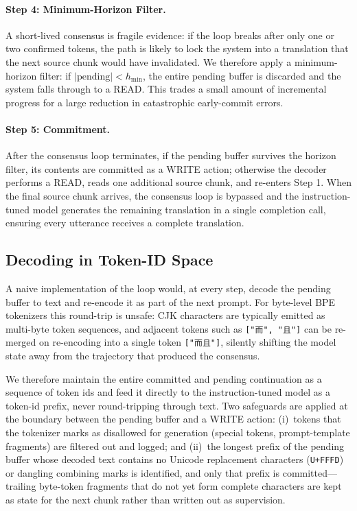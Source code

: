 \paragraph{Step 4: Minimum-Horizon Filter.}
A short-lived consensus is fragile evidence: if the loop breaks after only
one or two confirmed tokens, the path is likely to lock the system into a
translation that the next source chunk would have invalidated. We therefore
apply a minimum-horizon filter: if $|\text{pending}| < h_{\min}$, the entire
pending buffer is discarded and the system falls through to a READ. This
trades a small amount of incremental progress for a large reduction in
catastrophic early-commit errors.

\paragraph{Step 5: Commitment.}
After the consensus loop terminates, if the pending buffer survives the
horizon filter, its contents are committed as a WRITE action; otherwise the
decoder performs a READ, reads one additional source chunk, and re-enters
Step 1. When the final source chunk arrives, the consensus loop is bypassed
and the instruction-tuned model generates the remaining translation in a
single completion call, ensuring every utterance receives a complete
translation.

\subsection{Decoding in Token-ID Space}

A naive implementation of the loop would, at every step, decode the pending
buffer to text and re-encode it as part of the next prompt. For byte-level
BPE tokenizers this round-trip is unsafe: CJK characters are typically
emitted as multi-byte token sequences, and adjacent tokens such as
\texttt{["而", "且"]} can be re-merged on re-encoding into a single token
\texttt{["而且"]}, silently shifting the model state away from the
trajectory that produced the consensus.

We therefore maintain the entire committed and pending continuation as a
sequence of token ids and feed it directly to the instruction-tuned model
as a token-id prefix, never round-tripping through text. Two safeguards
are applied at the boundary between the pending buffer and a WRITE action:
(i)~tokens that the tokenizer marks as disallowed for generation (special
tokens, prompt-template fragments) are filtered out and logged; and
(ii)~the longest prefix of the pending buffer whose decoded text contains
no Unicode replacement characters (\texttt{U+FFFD}) or dangling combining
marks is identified, and only that prefix is committed---trailing byte-token
fragments that do not yet form complete characters are kept as state for
the next chunk rather than written out as supervision.

